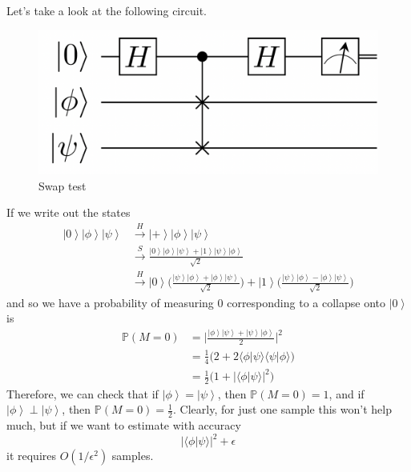 \documentclass{article}
\newcommand{\ket}[1]{\ensuremath{\left|#1\right\rangle}}
\newcommand{\braket}[2]{\langle #1 | #2 \rangle}
\begin{document}
      Let's take a look at the following circuit. 
      \begin{figure}[H]
        \centering 
        \includegraphics[scale=0.2]{img/swap_test.png}
        \caption{Swap test} 
        \label{fig:swap test}
      \end{figure}
      If we write out the states 
      \begin{align}
        \ket{0} \ket{\phi} \ket{\psi} & \xrightarrow{H} \ket{+} \ket{\phi} \ket{\psi} \\
                                      & \xrightarrow{S} \frac{\ket{0} \ket{\phi} \ket{\psi} + \ket{1} \ket{\psi} \ket{\phi}}{\sqrt{2}} \\ 
                                      & \xrightarrow{H} \ket{0} \bigg( \frac{\ket{\psi} \ket{\phi} + \ket{\phi} \ket{\psi}}{\sqrt{2}} \bigg) + \ket{1} \bigg( \frac{\ket{\psi} \ket{\phi} - \ket{\phi} \ket{\psi}}{\sqrt{2}} \bigg) 
      \end{align}
      and so we have a probability of measuring $0$ corresponding to a collapse onto $\ket{0}$ is 
      \begin{align}
        \mathbb{P}(M = 0) & = \bigg| \frac{\ket{\phi} \ket{\psi} + \ket{\psi} \ket{\phi}}{2} \bigg|^2  \\
                          & = \frac{1}{4} \big( 2 + 2 \braket{\phi}{\psi} \braket{\psi}{\phi} \big) \\
                          & = \frac{1}{2} \big( 1 + |\braket{\phi}{\psi}|^2 \big)
      \end{align}
      Therefore, we can check that if $\ket{\phi} = \ket{\psi}$, then $\mathbb{P}(M = 0) = 1$, and if $\ket{\phi} \perp \ket{\psi}$, then $\mathbb{P}(M = 0) = \frac{1}{2}$. Clearly, for just one sample this won't help much, but if we want to estimate with accuracy
      \begin{equation}
        | \braket{\phi}{\psi} |^2 + \epsilon  
      \end{equation}
      it requires $O(1/\epsilon^2)$ samples. 
\end{document}
